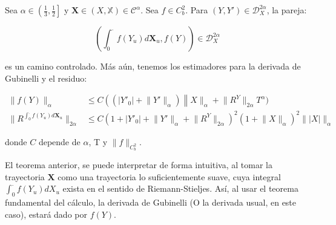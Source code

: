 \begin{lema}
	Sea $\alpha \in \left( \frac{1}{3}, \frac{1}{2} \right]$ y $\mathbf{X} \in (X, \mathbb{X}) \in \mathscr{C}^{\alpha}$. Sea $f \in C^2_b$. Para $(Y, Y') \in \mathscr{D}^{2\alpha}_X$, la pareja:

	\[
		\left(  \int_0^{\cdot} f(Y_u) d\mathbf{X}_u, f(Y)  \right) \in \mathscr{D}^{2\alpha}_X
	\]

	es un camino controlado. Más aún, tenemos los estimadores para la derivada de Gubinelli y el residuo:

	\begin{align*}
		\lVert f(Y) \rVert_{\alpha} &\leq C \left(  ( \lvert Y'_0 \rvert + \lVert Y' \rVert_{\alpha} )  \right \lVert X \rVert_{\alpha} + \lVert R^Y \rVert_{2\alpha} T^{\alpha}  ) \\
		\lVert R^{ \int_0^{\cdot} f(Y_u) d\mathbf{X}_u } \rVert_{2\alpha} &\leq C \left(  1 + \lvert Y'_0 \rvert + \lVert Y' \rVert_{\alpha} + \lVert R^Y \rVert_{2\alpha} \right)^{2} (1 + \lVert X \rVert_{\alpha})^2 \lVert \lvert X \rvert \rVert_{\alpha}
	\end{align*}

	donde $C$ depende de $\alpha$, T y $\lVert f \rVert_{C^2_b}$.

\end{lema}

El teorema anterior, se puede interpretar de forma intuitiva, al tomar la trayectoria $\mathbf{X}$ como una trayectoria lo suficientemente suave, cuya integral $\int_0^{\cdot} f(Y_u) dX_u$ exista en el sentido de Riemann-Stieljes. Así, al usar el teorema fundamental del cálculo, la derivada de Gubinelli (O la derivada usual, en este caso), estará dado por $f(Y)$.

